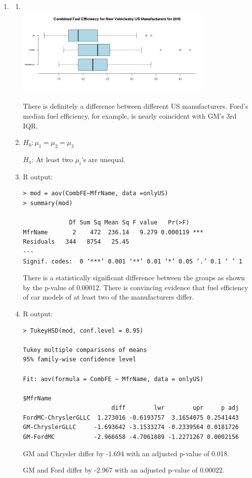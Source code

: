 \documentclass[12pt,letterpaper]{article}
\begin{document}
\begin{enumerate}
  \item
    \begin{enumerate}
      \item \hfill\\ \includegraphics[width=0.8\textwidth]{2a.png}

        There is definitely a difference between different US manufacturers.
        Ford's median fuel efficiency, for example, is nearly coincident with
        GM's 3rd IQR.

      \item $H_0: \mu_1 = \mu_2 = \mu_3$

        $H_a$: At least two $\mu_i$'s are unequal.

      \item R output:
        \begin{verbatim}
> mod = aov(CombFE~MfrName, data =onlyUS)
> summary(mod)

             Df Sum Sq Mean Sq F value   Pr(>F)    
MfrName       2    472  236.14   9.279 0.000119 ***
Residuals   344   8754   25.45                     
---
Signif. codes:  0 ‘***’ 0.001 ‘**’ 0.01 ‘*’ 0.05 ‘.’ 0.1 ‘ ’ 1
        \end{verbatim}

        There is a statistically significant difference between the groups as
        shown by the p-value of 0.00012. There is convincing evidence that fuel
        efficiency of car models of at least two of the manufacturers differ.

      \item R output:
        \begin{verbatim}
> TukeyHSD(mod, conf.level = 0.95)

Tukey multiple comparisons of means
95% family-wise confidence level

Fit: aov(formula = CombFE ~ MfrName, data = onlyUS)

$MfrName
                         diff        lwr        upr     p adj
FordMC-ChryslerGLLC  1.273016 -0.6193757  3.1654075 0.2541443
GM-ChryslerGLLC     -1.693642 -3.1533274 -0.2339564 0.0181726
GM-FordMC           -2.966658 -4.7061889 -1.2271267 0.0002156
        \end{verbatim}

        GM and Chrysler differ by -1.694 with an adjusted p-value of 0.018.

        GM and Ford differ by -2.967 with an adjusted p-value of 0.00022.
    \end{enumerate}
\end{enumerate}
\end{document}
